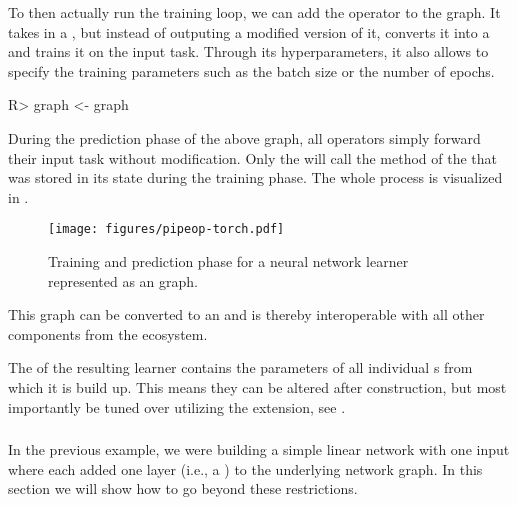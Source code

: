 \documentclass[article]{jss}
\theoremstyle{definition}
\begin{document}
To then actually run the training loop, we can add the  operator to the graph.
It takes in a , but instead of outputing a modified version of it, converts it into a  and trains it on the input task.
Through its hyperparameters, it also allows to specify the training parameters such as the batch size or the number of epochs.

\begin{CodeInput}
R> graph <- graph %
\end{CodeInput}

During the prediction phase of the above graph, all  operators simply forward their input task without modification.
Only the  will call the  method of the  that was stored in its state during the training phase.
The whole process is visualized in .

\begin{figure}
    \centering
    \texttt{[image: figures/pipeop-torch.pdf]}
    \caption{Training and prediction phase for a neural network learner represented as an \mlrtpipelines{} graph.}
    \label{fig:pipeop-torch}
\end{figure}

This graph can be converted to an  and is thereby interoperable with all other components from the  ecosystem.


The  of the resulting learner contains the parameters of all individual s from which it is build up.
This means they can be altered after construction, but most importantly be tuned over utilizing the  extension, see .

\subsubsection[More complex architectures]{}

In the previous example, we were building a simple linear network with one input where each  added one layer (i.e., a ) to the underlying network graph.
In this section we will show how to go beyond these restrictions.
\end{document}
